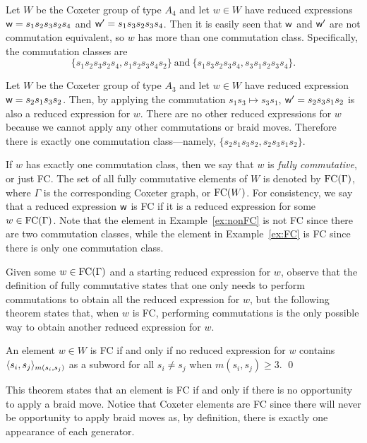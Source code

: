 \begin{example}\label{ex:nonFC} Let $W$ be the Coxeter group of type $A_4$ and let $w \in W$ have reduced expressions $\mathsf{w} = s_1 s_2 s_3 s_2 s_4$ and $\mathsf{w}' = s_1 s_3 s_2 s_3 s_4$.
    Then it is easily seen that $\mathsf{w}$ and $\mathsf{w}'$ are not commutation equivalent, so $w$ has more than one commutation class. Specifically, the commutation classes are $$\{s_1s_2s_3s_2s_4, s_1s_2s_3s_4s_2\} ~\text{and}~ \{s_1s_3s_2s_3s_4, s_3s_1s_2s_3s_4\}.$$
\end{example}

\begin{example}\label{ex:FC} Let $W$ be the Coxeter group of type $A_3$ and let $w \in W$ have reduced expression $\mathsf{w} = s_2s_1s_3s_2$. Then, by applying the commutation $s_1s_3 \mapsto s_3s_1$, $\mathsf{w}' = s_2s_3s_1s_2$ is also a reduced expression for $w$.
    There are no other reduced expressions for $w$ because we cannot apply any other commutations or braid moves. Therefore there is exactly one commutation class---namely, $\{s_2s_1s_3s_2, s_2s_3s_1s_2\}$.
\end{example}
    
    If $w$ has exactly one commutation class, then we say that $w$ is \emph{fully commutative}, or just FC.
    The set of all fully commutative elements of $W$ is denoted by $\operatorname{FC}(\Gamma)$, where $\Gamma$ is the corresponding Coxeter graph, or $\operatorname{FC}(W)$.
    For consistency, we say that a reduced expression $\mathsf{w}$ is FC if it is a reduced expression for some $w \in\operatorname{FC}(\Gamma)$.
    Note that the element in Example~\ref{ex:nonFC} is not FC since there are two commutation classes, while the element in Example~\ref{ex:FC} is FC since there is only one commutation class.

    Given some $w\in\operatorname{FC}(\Gamma)$ and a starting reduced expression for $w$, observe that the definition of fully commutative states that one only needs to perform commutations to obtain all the reduced expression for $w$, but the following theorem states that, when $w$ is FC, performing commutations is the only possible way to obtain another reduced expression for $w$.

\begin{theorem} \label{thm:stem} An element $w \in W$ is FC if and only if no reduced expression for $w$ contains $\langle s_i,s_j \rangle_{m(s_i,s_j)}$ as a subword for all $s_i \neq s_j$ when $m(s_i,s_j) \geq 3$. \qed
\end{theorem}

    This theorem states that an element is FC if and only if there is no opportunity to apply a braid move.
    Notice that Coxeter elements are FC since there will never be opportunity to apply braid moves as, by definition, there is exactly one appearance of each generator.

